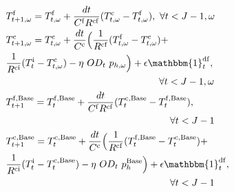 \documentclass[11pt,a4paper]{article}
\begin{document}
\begin{subequations}
\begin{align}
           & T^{\rm{f}}_{t+1,\omega} = T^{\rm{f}}_{t,\omega} +  \frac{dt}{C^{\rm{f}}R^{\rm{cf}}} (T^{\rm{c}}_{t,\omega} - T^{\rm{f}}_{t,\omega}), \ \forall{t<J-1,\omega} \label{P2:state-space-1}                                                                                                                                                                                                                                                                                                                                                                \\
           & T^{\rm{c}}_{t+1,\omega} = T^{\rm{c}}_{t,\omega} +    \frac{dt}{C^{\rm{c}}}\Bigl(\frac{1}{R^{\rm{cf}}} (T^{\rm{f}}_{t,\omega} - T^{\rm{c}}_{t,\omega}) +  \notag                                                                                                                                                                                                                                                                                                                                                                                      \\ & \frac{1}{R^{\rm{ci}}} (T^{\rm{i}}_t - T^{\rm{c}}_{t,\omega}) - \eta  \  OD_t \ p_{h,\omega} \Bigr) + \epsilon \mathbbm{1}^{\rm{df}}_{t}, \notag \\ & \hspace{5.6cm} \forall{t<J-1,\omega} \label{P2:state-space-2} \\
           & T^{\rm{f},\text{Base}}_{t+1} = T^{\rm{f},\text{Base}}_{t} +   \frac{dt}{C^{\rm{f}}R^{\rm{cf}}} (T^{\rm{c},\text{Base}}_{t} - T^{\rm{f},\text{Base}}_{t}), \notag                                                                                                                                                                                                                                                                                                                                                                                     \\ & \hspace{6cm}\forall{t<J-1} \label{P2:state-space-3}                                                                                         \\
           & T^{\rm{c},\text{Base}}_{t+1} = T^{\rm{c},\text{Base}}_t +   \frac{dt}{C^{\rm{c}}}\Bigl(\frac{1}{R^{\rm{cf}}} (T^{\rm{f},\text{Base}}_t - T^{\rm{c},\text{Base}}_t) + \notag                                                                                                                                                                                                                                                                                                                                                                          \\ & \frac{1}{R^{\rm{ci}}} (T^{\rm{i}}_t - T^{\rm{c},\text{Base}}_t) - \eta  \  OD_t \ p_{h}^{\text{Base}} \Bigr) + \epsilon \mathbbm{1}^{\rm{df}}_{t}, \notag \\ & \hspace{6cm} \forall{t<J-1} \label{P2:state-space-4} \\

\end{align}
\end{subequations}
\end{document}
